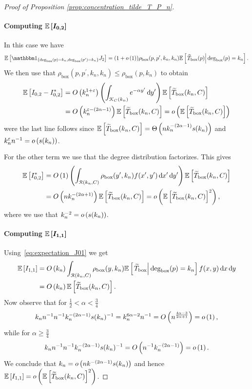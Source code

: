 \begin{proof}[Proof of Proposition \ref{prop:concentration_tilde_T_P_n}]
\paragraph{Computing $\bm{\mathbb{E}\left[I_{0,2}\right]}$} In this case we have
\[
	\Exp{\ind{\Dbox(p) = k_n, \Dbox(p^\prime) = k_n}J_2} = (1+\smallO{1})\rho_{\text{box}}(p,p^\prime,k_n,k_n)
	\CExp{\widetilde{T}_{\text{box}}(p)}{\Dbox(p) = k_n}.
\]
We then use that $\rho_{\text{box}}(p,p^\prime,k_n,k_n) \le \rho_{\text{box}}(p,k_n)$ to obtain
\begin{align*}
	\mathbb{E}\left[I_{0,2}-I_{0,2}^\ast\right] 
	&= O\left(k_n^{1+\varepsilon}\right) \left(\int_{{\mathcal K}_{C}(k_n)} e^{-\alpha y^\prime} \operatorname{\mathrm{d}\hspace{-2pt}} y^\prime\right) 
		\mathbb{E}\left[\widetilde{T}_{\text{box}}(k_n,C)\right]\\
	&= O\left(k_n^{\varepsilon -(2\alpha - 1)}\right)\mathbb{E}\left[\widetilde{T}_{\text{box}}(k_n,C)\right]
		= o\left(\mathbb{E}\left[\widetilde{T}_{\text{box}}(k_n,C)\right]\right)
\end{align*}
were the last line follows since $\mathbb{E}\left[\widetilde{T}_{\text{box}}(k_n,C)\right] = \Theta\left(n k_n^{-(2\alpha - 1)}s(k_n)\right)$ and $k_n^{\varepsilon}n^{-1} = o\left(s(k_n)\right)$.

For the other term we use that the degree distribution factorizes. This gives
\begin{align*}
	\mathbb{E}\left[I_{0,2}^\ast\right] 
	&= O\left(1\right)\left(\int_{{\mathcal R}(k_n,C)} \rho_{\text{box}}(y^\prime,k_n) f(x^\prime,y^\prime) 
		\operatorname{\mathrm{d}\hspace{-2pt}} x^\prime \operatorname{\mathrm{d}\hspace{-2pt}} y^\prime \right)\mathbb{E}\left[\widetilde{T}_{\text{box}}(k_n,C)\right]\\
	&= O\left(n k_n^{-(2\alpha + 1)}\right)\mathbb{E}\left[\widetilde{T}_{\text{box}}(k_n,C)\right]
		= o\left(\mathbb{E}\left[\widetilde{T}_{\text{box}}(k_n,C)\right]^2\right),
\end{align*}
where we use that $k_n^{-2} = o\left(s(k_n)\right)$.

\paragraph{Computing $\bm{\mathbb{E}\left[I_{1,1}\right]}$}

Using~\eqref{eq:expectation_J01} we get
\begin{align*}
	\mathbb{E}\left[I_{1,1}\right]
	&= O\left(k_n\right) \int_{{\mathcal R}(k_n,C)} \rho_{\text{box}}(y,k_n) \mathbb{E}\left[\left.\widetilde{T}_{\text{box}}\right|\text{deg}_{\text{box}}(p) = k_n\right]
		f(x,y) \operatorname{\mathrm{d}\hspace{-2pt}} x \operatorname{\mathrm{d}\hspace{-2pt}} y\\
	&= O\left(k_n\right)\mathbb{E}\left[\widetilde{T}_{\text{box}}(k_n,C)\right].
\end{align*}
Now observe that for $\frac{1}{2} < \alpha < \frac{3}{4}$
\[
	k_n n^{-1} n^{-1} k_n^{-(2\alpha -1)} s(k_n)^{-1} = k_n^{6\alpha - 2} n^{-1}
	= O\left(n^{\frac{4\alpha - 3}{2\alpha + 1}}\right) = o\left(1\right),
\]
while for $\alpha \ge \frac{3}{4}$
\[
	k_n n^{-1} n^{-1} k_n^{-(2\alpha -1)} s(k_n)^{-1} = O\left(n^{-1} k_n^{-(2\alpha - 1)}\right) = o\left(1\right).
\]
We conclude that $k_n = o\left(n k^{-(2\alpha - 1)}s(k_n)\right)$ and hence $\mathbb{E}\left[I_{1,1}\right] = o\left(\mathbb{E}\left[\widetilde{T}_{\text{box}}(k_n,C)\right]^2\right)$.


\end{proof}